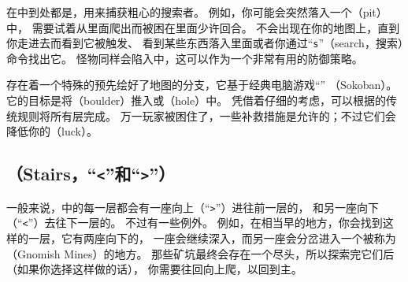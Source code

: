 \documentclass[a4paper, 10pt]{article}
\begin{document}
在\zhTransDungeon{}中到处都是\zhTransTraps，用来捕获粗心的搜索者。
例如，你可能会突然落入一个\zhTransPit{}（pit）中，
需要试着从里面爬出而被困在里面少许回合。
\zhTransTraps{}不会出现在你的地图上，直到你走进去而看到它被触发、
看到某些东西落入里面或者你通过“{\tt s}”（search，搜索）命令找出它。
怪物同样会陷入\zhTransTraps{}中，这可以作为一个非常有用的防御策略。

存在着一个特殊的预先绘好了地图的\zhTransDungeon{}分支，它基于经典电脑游戏“{\tt \zhTransSokoban}”
（Sokoban）。
它的目标是将\zhTransBoulders{}（boulder）推入\zhTransPit{}或\zhTransHole{}（hole）中。
凭借着仔细的考虑，可以根据\zhTransSokoban{}的传统规则将所有层完成。
万一玩家被困住了，一些补救措施是允许的；不过它们会降低你的\zhTransLuck（luck）。

\subsection*{\zhTransStairs（Stairs，“{\tt <}”和“{\tt >}”）}

一般来说，\zhTransDungeon{}中的每一层都会有一座向上（“{\tt >}”）进往前一层的\zhTransStairs，
和另一座向下（“{\tt <}”）去往下一层的\zhTransStairs。
不过有一些例外。
例如，在\zhTransDungeon{}相当早的地方，你会找到这样的一层，它有两座向下的\zhTransStairs{}，
一座会继续深入\zhTransDungeon{}，而另一座会分岔进入一个被称为\zhTransGnomishMines{}
（Gnomish Mines）的地方。
那些矿坑最终会存在一个尽头，所以探索完它们后（如果你选择这样做的话），
你需要往回向上爬，以回到主\zhTransDungeon{}。
\end{document}
